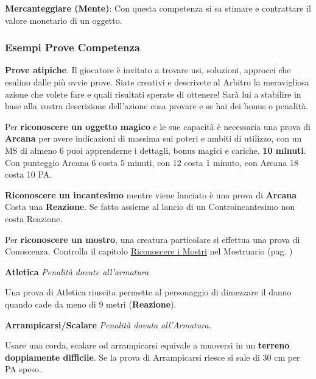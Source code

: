 \documentclass[12pt,a4paper,twoside,openany]{book}
\begin{document}
\begin{multicols}{2}
\textbf{Mercanteggiare (Mente)}: Con questa competenza si sa stimare e contrattare il valore monetario di un oggetto.

\subsubsection{Esempi Prove Competenza}\label{esempiprovecompetenza}\hypertarget{esempiprovecompetenze}{}

\textbf{Prove atipiche}. Il giocatore è invitato a trovare usi, soluzioni, approcci che esulino dalle più ovvie prove. Siate creativi e descrivete al Arbitro la meravigliosa azione che volete fare e quali risultati sperate di ottenere! Sarà lui a stabilire in base alla vostra descrizione dell'azione cosa provare e se hai dei bonus o penalità.

\medskip

Per \textbf{riconoscere un oggetto magico} e le sue capacità è necessaria una prova di \textbf{Arcana} per avere indicazioni di massima sui poteri e ambiti di utilizzo, con un MS di almeno 6 puoi apprenderne i dettagli, bonus magici e cariche. \textbf{10 minuti}. Con punteggio Arcana 6 costa 5 minuti, con 12 costa 1 minuto, con Arcana 18 costa 10 PA.

\medskip

\textbf{Riconoscere un incantesimo} mentre viene lanciato è una prova di \textbf{Arcana} Costa una \textbf{Reazione}. Se fatto assieme al lancio di un Controincantesimo non costa Reazione.

\medskip

Per \textbf{riconoscere un mostro}, una creatura particolare si effettua una prova di Conoscenza. Controlla il capitolo \hyperlink{riconoscereimostri}{Riconoscere i Mostri} nel Mostruario (pag. \pageref{riconoscereimostri})

\medskip

\textbf{Atletica} \textit{Penalità dovute all'armatura}

Una prova di Atletica riuscita permette al personaggio di dimezzare il danno quando cade da meno di 9 metri (\textbf{Reazione}).

\medskip

\textbf{Arrampicarsi/Scalare}  \textit{Penalità dovuta all'Armatura.}

\medskip

Usare una corda, scalare od arrampicarsi equivale a muoversi in un \textbf{terreno doppiamente difficile}. Se la prova di Arrampicarsi riesce si sale di 30 cm per PA speso.


\end{multicols}
\end{document}
